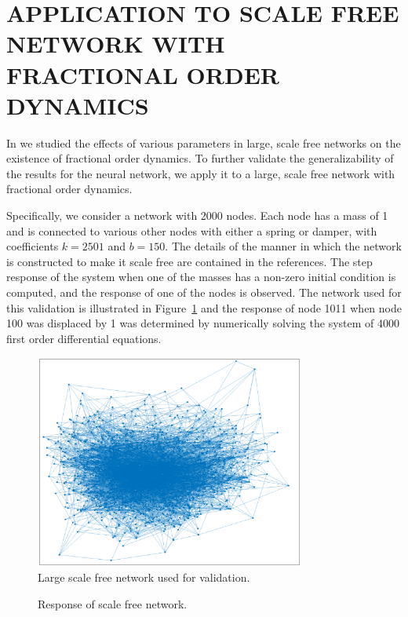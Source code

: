 \section{APPLICATION TO SCALE FREE NETWORK WITH FRACTIONAL ORDER DYNAMICS}
\label{sec:scalefree}

In \cite{goodwinemed2023,goodwinemmar2023} we studied the effects of various
parameters in large, scale free networks on the existence of fractional order
dynamics. To further validate the generalizability of the results for the neural
network, we apply it to a large, scale free network with fractional order
dynamics.

Specifically, we consider a network with 2000 nodes. Each node has a mass of 1
and is connected to various other nodes with either a spring or damper, with
coefficients $k = 2501$ and $b = 150$. The details of the manner in which the
network is constructed to make it scale free are contained in the references.
The step response of the system when one of the masses has a non-zero initial
condition is computed, and the response of one of the nodes is observed. The
network used for this validation is illustrated in Figure~\ref{fig:network} and
the response of node 1011 when node 100 was displaced by 1 was determined by
numerically solving the system of 4000 first order differential equations.

\begin{figure}
\centering
\includegraphics[width=3.5in]{network}
\caption{Large scale free network used for validation.}
\label{fig:network}
\end{figure}

\begin{figure}
\centering

\vspace*{-5pt}
\caption{Response of scale free network.}
\label{fig:sfresp}
\end{figure}

